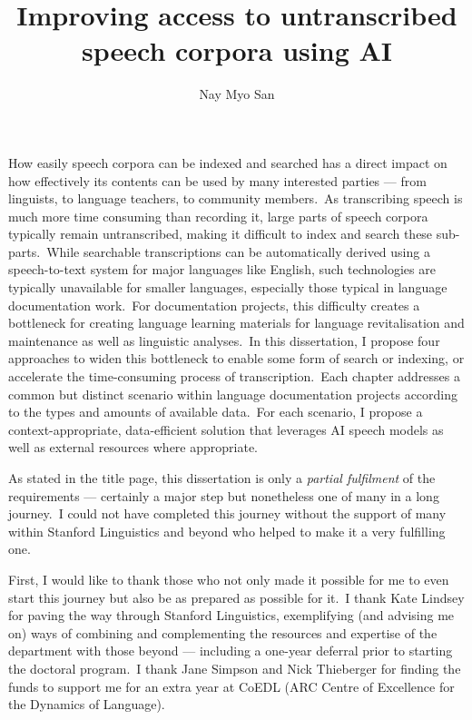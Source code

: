 \documentclass{report}
\begin{document}

\title{Improving access to untranscribed speech corpora using AI}
\author{Nay Myo San}
 
\beforepreface

\setcounter{page}{4}

How easily speech corpora can be indexed and searched has a direct impact on how effectively its contents can be used by many interested parties --- from linguists, to language teachers, to community members.~As transcribing speech is much more time consuming than recording it, large parts of speech corpora typically remain untranscribed, making it difficult to index and search these sub-parts.~While searchable transcriptions can be automatically derived using a speech-to-text system for major languages like English, such technologies are typically unavailable for smaller languages, especially those typical in language documentation work.~For documentation projects, this difficulty creates a bottleneck for creating language learning materials for language revitalisation and maintenance as well as linguistic analyses.~In this dissertation, I propose four approaches to widen this bottleneck to enable some form of search or indexing, or accelerate the time-consuming process of transcription.~Each chapter addresses a common but distinct scenario within language documentation projects according to the types and amounts of available data.~For each scenario, I propose a context-appropriate, data-efficient solution that leverages AI speech models as well as external resources where appropriate.


As stated in the title page, this dissertation is only a \emph{partial fulfilment} of the requirements --- certainly a major step but nonetheless one of many in a long journey.~I could not have completed this journey without the support of many within Stanford Linguistics and beyond who helped to make it a very fulfilling one.

First, I would like to thank those who not only made it possible for me to even start this journey but also be as prepared as possible for it.~I thank Kate Lindsey for paving the way through Stanford Linguistics, exemplifying (and advising me on) ways of combining and complementing the resources and expertise of the department with those beyond --- including a one-year deferral prior to starting the doctoral program.~I thank Jane Simpson and Nick Thieberger for finding the funds to support me for an extra year at CoEDL (ARC Centre of Excellence for the Dynamics of Language).
\end{document}
